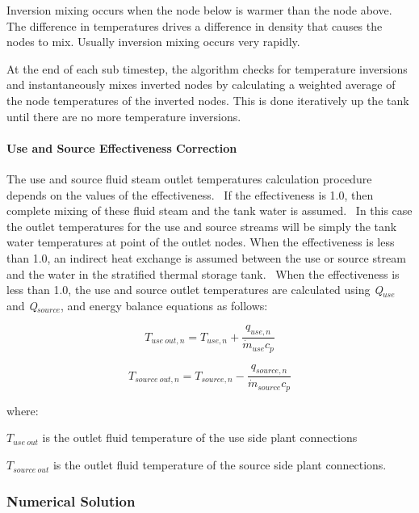 Inversion mixing occurs when the node below is warmer than the node above. The difference in temperatures drives a difference in density that causes the nodes to mix. Usually inversion mixing occurs very rapidly.

At the end of each sub timestep, the algorithm checks for temperature inversions and instantaneously mixes inverted nodes by calculating a weighted average of the node temperatures of the inverted nodes. This is done iteratively up the tank until there are no more temperature inversions.

\paragraph{Use and Source Effectiveness Correction}

The use and source fluid steam outlet temperatures calculation procedure depends on the values of the effectiveness.~ If the effectiveness is 1.0, then complete mixing of these fluid steam and the tank water is assumed.~ In this case the outlet temperatures for the use and source streams will be simply the tank water temperatures at point of the outlet nodes. When the effectiveness is less than 1.0, an indirect heat exchange is assumed between the use or source stream and the water in the stratified thermal storage tank.~ When the effectiveness is less than 1.0, the use and source outlet temperatures are calculated using \emph{Q\(_{use}\)} and \emph{Q\(_{source}\)}, and energy balance equations as follows:

\begin{equation}
{T_{use~out,n}} = {T_{use,n}} + \frac{{{q_{use,n}}}}{{{{\dot m}_{use}}{c_p}}}
\end{equation}

\begin{equation}
{T_{source~out,n}} = {T_{source,n}} - \frac{{{q_{source,n}}}}{{{{\dot m}_{source}}{c_p}}}
\end{equation}

where:

\(T_{use~out}\) is the outlet fluid temperature of the use side plant connections

\(T_{source~out}\) is the outlet fluid temperature of the source side plant connections.

\subsubsection{Numerical Solution}\label{numerical-solution}

